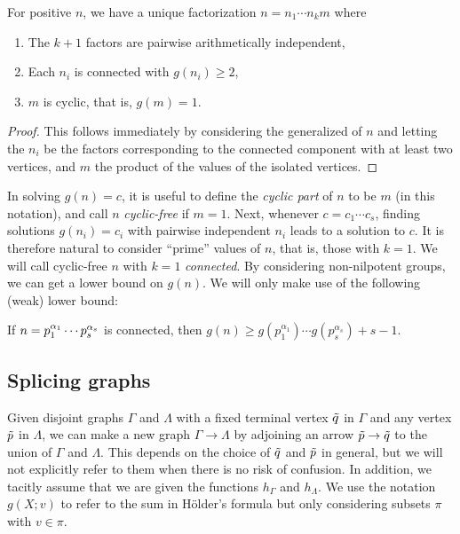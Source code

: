 \begin{prop}
	For positive $n$, we have a unique factorization $n = n_1 \cdots n_k m$ where\pagebreak[3]
	\begin{enumerate} \listspace
		\item The $k + 1$ factors are pairwise arithmetically independent,
		\item Each $n_i$ is connected with $g(n_i) \ge 2$,
		\item $m$ is cyclic, that is, $g(m) = 1$.
	\end{enumerate} \textspace
\end{prop}
\begin{proof}
	This follows immediately by considering the generalized  of $n$ and letting the $n_i$ be the factors corresponding to the connected component with at least two vertices,
	and $m$ the product of the values of the isolated vertices.
\end{proof}

In solving $g(n) = c$, it is useful to define the \emph{cyclic part} of $n$ to be $m$ (in this notation), and call $n$ \emph{cyclic-free} if $m = 1$.
Next, whenever $c = c_1 \cdots c_s$, finding solutions $g(n_i) = c_i$ with pairwise independent $n_i$ leads to a solution to $c$.
It is therefore natural to consider ``prime'' values of $n$, that is, those with $k = 1$.
We will call cyclic-free $n$ with $k = 1$ \emph{connected}.
By considering non-nilpotent groups, we can get a lower bound on $g(n)$.
We will only make use of the following (weak) lower bound:

\begin{prop}
	If $n = p_1^{\alpha_1} \cdots p_s^{\alpha_s}$ is connected, then $g(n) \ge g(p_1^{\alpha_1})\cdots g(p_s^{\alpha_s}) + s - 1.$
\end{prop}

\subsection{Splicing graphs}
Given disjoint graphs $\Gamma$ and $\Lambda$ with a fixed terminal vertex $\tilde{q}$ in $\Gamma$ and any vertex $\tilde{p}$ in $\Lambda$,
we can make a new graph $\Gamma \to \Lambda$ by adjoining an arrow $\tilde{p} \to \tilde{q}$ to the union of $\Gamma$ and $\Lambda$.
This depends on the choice of $\tilde{q}$ and $\tilde{p}$ in general, but we will not explicitly refer to them when there is no risk of confusion.
In addition, we tacitly assume that we are given the functions $h_\Gamma$ and $h_\Lambda$.
We use the notation $g(X; v)$ to refer to the sum in Hölder's formula but only considering subsets $\pi$ with $v \in \pi$.

